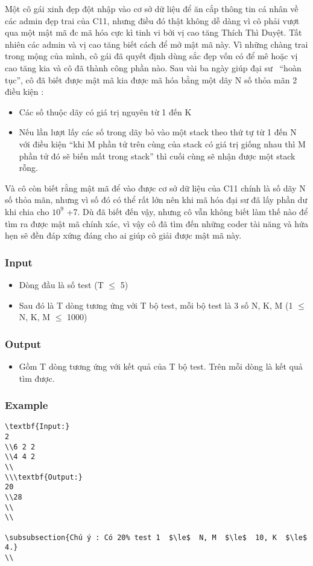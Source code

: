 



   Một cô gái xinh đẹp đột nhập vào cơ sở dữ liệu để ăn cắp thông tin cá nhân về các admin đẹp trai của C11, nhưng điều đó thật không dễ dàng vì cô phải vượt qua một mật mã đc mã hóa cực kì tinh vi bởi vị cao tăng Thích Thì Duyệt. Tất nhiên các admin và vị cao tăng biết cách để mở mật mã này. Vì những chàng trai trong mộng của mình, cô gái đã quyết định dùng sắc đẹp vốn có để mê hoặc vị cao tăng kia và cô đã thành công phần nào. Sau vài ba ngày giúp đại sư  “hoàn tục”, cô đã biết được mật mã kia được mã hóa bằng một dãy N số thỏa mãn 2 điều kiện :  
\begin{itemize}
	\item     Các số thuộc dãy có giá trị nguyên từ 1 đến K   
	\item     Nếu lần lượt lấy các số trong dãy bỏ vào một stack theo thứ tự từ 1 đến N  với điều kiện “khi M phần tử trên cùng của stack có giá trị giống nhau  thì M phần tử đó sẽ biến mất trong stack” thì cuối cùng sẽ nhận được một  stack rỗng.   
\end{itemize}

   Và cô còn biết rằng mật mã để vào được cơ sở dữ liệu của C11 chính là số dãy N số thỏa mãn, nhưng vì số đó có thể rất lớn nên khi mã hóa đại sư đã lấy phần dư khi chia cho $10^{9}$   +7. Dù đã biết đến vậy, nhưng cô vẫn không biết làm thế nào để tìm ra được mật mã chính xác, vì vậy cô đã tìm đến những coder tài năng và hứa hẹn sẽ đền đáp xứng đáng cho ai giúp cô giải được mật mã này.  

\subsubsection{   Input  }
\begin{itemize}
	\item     Dòng đầu là số test (T  $\le$  5)   
	\item     Sau đó là T dòng tương ứng với T bộ test, mỗi bộ test là 3 số N, K, M (1  $\le$  N, K, M  $\le$  1000)   
\end{itemize}

\subsubsection{   Output  }
\begin{itemize}
	\item     Gồm T dòng tương ứng với kết quả của T bộ test. Trên mỗi dòng là kết quả tìm được.   
\end{itemize}

\subsubsection{   Example  }
\begin{verbatim}
\textbf{Input:}
2
\\6 2 2
\\4 4 2
\\
\\\textbf{Output:}
20
\\28 
\\
\\

\subsubsection{Chú ý : Có 20% test 1  $\le$  N, M  $\le$  10, K  $\le$  4.}
\\\end{verbatim}
